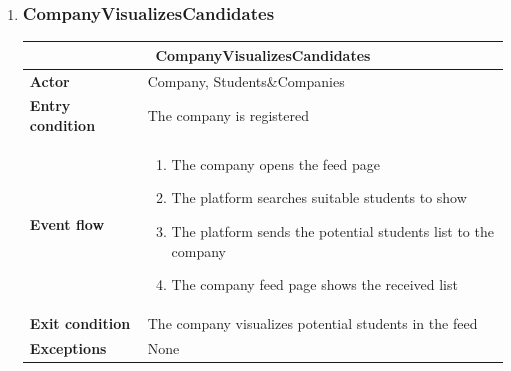 \begin{enumerate}[label=\textbf{UC\arabic* -}]
\item \subsubsection{CompanyVisualizesCandidates}

\begin{table}[H]
    \centering
    \begin{tabular}{|l|m{10cm}|}
        \hline \multicolumn{2}{|c|}{\textbf{CompanyVisualizesCandidates}} \\
        \hline \textbf{Actor} & Company, Students\&Companies \\
        \hline \textbf{Entry condition} & The company is registered \\
        \hline \textbf{Event flow} &
            \begin{enumerate}[label=\arabic*]
                \item The company opens the feed page
                \item The platform searches suitable students to show
                \item The platform sends the potential students list to the company
                \item The company feed page shows the received list
            \end{enumerate} \\
        \hline \textbf{Exit condition} & The company visualizes potential students in the feed \\
        \hline \textbf{Exceptions} & None \\
        \hline
    \end{tabular}
\end{table}

\begin{figure}[H]
    \centering
\end{figure}


\end{enumerate}

